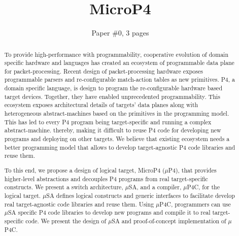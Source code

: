 \documentclass{hotnets19}
\begin{document}


\title{MicroP4}

\author{Paper \#0, 3 pages}

\maketitle

\begin{abstract}
To provide high-performance with programmability, cooperative evolution of domain specific hardware and languages has created an ecosystem of programmable data plane for packet-processing.
Recent design of packet-processing hardware exposes programmable parsers and re-configurable match-action tables as new primitives.
P4, a domain specific language, is design to program the re-configurable hardware based target devices. Together, they have enabled unprecedented programmability.
This ecosystem exposes architectural details of targets' data planes along with heterogeneous abstract-machines based on the primitives in the programming model.
This has led to every P4 program being target-specific and running a complex abstract-machine.
thereby, making it difficult to reuse P4 code for developing new programs and deploying on other targets.
We believe that existing ecosystem needs a better programming model that allows to develop target-agnostic P4 code libraries and reuse them.


To this end, we propose a design of logical target, MicroP4 ($\mu$P4), that provides higher-level abstractions and decouples P4 programs from real target-specific constructs.
We present a switch architecture, $\mu$SA, and a compiler, $\mu$P4C, for the logical target.
$\mu$SA defines logical constructs and generic interfaces to facilitate develop real target-agnostic code libraries and reuse them.
Using $\mu$P4C, programmers can use $\mu$SA specific P4 code libraries to develop new programs and compile it to real target-specific code.
We present the design of $\mu$SA and proof-of-concept implementation of $\mu$P4C.
\end{abstract}


\end{document}
